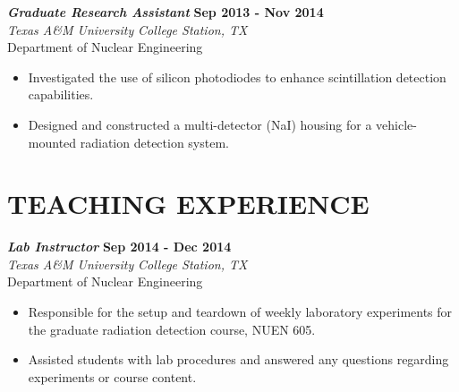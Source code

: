 \documentclass[margin, 10pt]{style/res} %
\begin{document}
\begin{resume}
{\sl\bf Graduate Research Assistant} \hfill {\bf Sep 2013 - Nov 2014} \\
{\sl Texas A\&M University} \hfill {\sl College Station, TX}\\
Department of Nuclear Engineering
\vspace{2pt}
\begin{itemize}[leftmargin=4ex] \itemsep -2pt
\item Investigated the use of silicon photodiodes to enhance scintillation detection capabilities.
\item Designed and constructed a multi-detector (NaI) housing for a vehicle-mounted radiation detection system.
\end{itemize} 





 
\section{\small{TEACHING EXPERIENCE}}

{\sl\bf Lab Instructor} \hfill {\bf Sep 2014 - Dec 2014} \\
{\sl Texas A\&M University} \hfill {\sl College Station, TX}\\
Department of Nuclear Engineering
\vspace{2pt}
\begin{itemize}[leftmargin=4ex] \itemsep -2pt
\item Responsible for the setup and teardown of weekly laboratory experiments for the graduate radiation detection course, NUEN 605.
\item Assisted students with lab procedures and answered any questions regarding experiments or course content.
\end{itemize} 


\end{resume}
\end{document}
